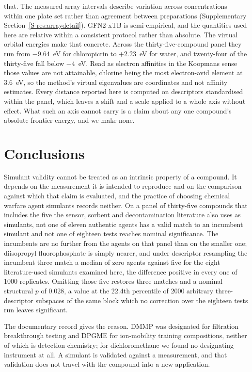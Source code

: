 \documentclass[1p,times]{elsarticle}
\begin{document}
that. The measured-array intervals describe variation across concentrations within
one plate set rather than agreement between preparations (Supplementary
Section~\ref{S-res:arraydetail}). GFN2-xTB is
semi-empirical, and the quantities used here are relative within a consistent
protocol rather than absolute. The virtual orbital energies make that concrete.
Across the thirty-five-compound panel they run from $-9.64$~eV for chloropicrin
to $+2.23$~eV for water, and twenty-four of the thirty-five fall below
$-4$~eV. Read as electron affinities in the Koopmans sense those values are not
attainable, chlorine being the most electron-avid element at 3.6~eV, so the
method's virtual eigenvalues are coordinates and not affinity estimates. Every
distance reported here is computed on descriptors standardised within the panel,
which leaves a shift and a scale applied to a whole axis without effect. What
such an axis cannot carry is a claim about any one compound's absolute frontier
energy, and we make none.

\section{Conclusions}

Simulant validity cannot be treated as an intrinsic property of a compound. It
depends on the measurement it is intended to reproduce and on the comparison
against which that claim is evaluated, and the practice of choosing chemical
warfare agent simulants records neither. On a panel of
thirty-five compounds that includes the five the sensor, sorbent and
decontamination literature also uses as simulants, not one of eleven authentic
agents has a valid match to an incumbent simulant and not one of eighteen tests
reaches nominal significance. The incumbents are no further from the agents on that
panel than on the smaller one; diisopropyl fluorophosphate is simply nearer, and
under descriptor resampling the incumbent three match a median of zero agents
against five for the eight literature-used simulants examined here, the
difference positive in every
one of 1000 replicates. Omitting those five restores three matches and a nominal
structural $p$ of 0.028, a value at the 22.4th percentile of 2000 arbitrary
three-descriptor subspaces of the same block which no correction over the
eighteen tests run leaves significant.

The documentary record gives the reason. DMMP was designated for filtration
breakthrough testing and DPGME for ion-mobility training compositions, neither
of which is detection chemistry; for dichloromethane we found no designating
instrument at all. A simulant is validated against a measurement, and that
validation does not travel with the compound into a new application.
\end{document}
